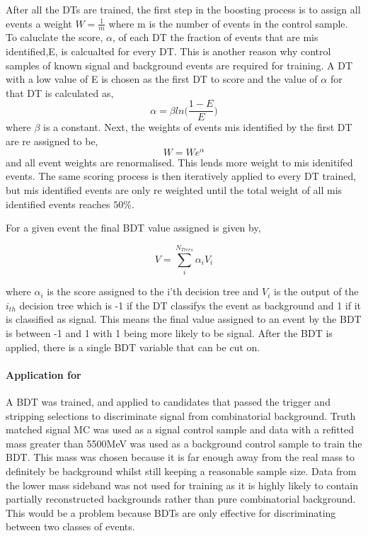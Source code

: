 After all the DTs are trained, the first step in the boosting process is to assign all events a weight $W=\frac{1}{m}$ where m is the number of events in the control sample.  To caluclate the score, $\alpha$, of each DT the fraction of events that are mis identified,E, is calcualted for every DT. This is another reason why control samples of known signal and background events are required for training.  A DT with a low value of E is chosen as the first DT to score and the value of $\alpha$ for that DT is calculated as,
\begin{equation}
  \alpha=\beta ln\big(\frac{1-E}{E}\big)
\end{equation}
where $\beta$ is a constant.  Next, the weights of events mis identified by the first DT are re assigned to be,
\begin{equation}
  W=W e^{\alpha}
\end{equation}
and all event weights are renormalised.  This lends more weight to mis idenitifed events. The same scoring process is then iteratively applied to every DT trained, but mis identified events are only re weighted until the total weight of all mis identified events reaches $50\%$. 

For a given event the final BDT value assigned is given by,

\begin{equation}
  V=\sum \limits_{i}^{N_{Trees}}\alpha_iV_i
\end{equation}

where $\alpha_i$ is the score assigned to the i'th decision tree and $V_i$ is the output of the $i_{th}$ decision tree which is -1 if the DT classifys the event as background and 1 if it is classified as signal.  This means the final value assigned to an event by the BDT is between -1 and 1 with 1 being more likely to be signal.  After the BDT is applied, there is a single BDT variable that can be cut on.

\paragraph{Application for \Bd \to \Kstar \etaz}
A BDT was trained, and applied to candidates that passed the trigger and stripping selections to discriminate signal from combinatorial background.  Truth matched signal MC was used as a signal control sample and data with a refitted \Bd mass greater than 5500MeV was used as a background control sample to train the BDT.  This mass was chosen because it is far enough away from the real \Bd mass to definitely be background whilst still keeping a reasonable sample size.  Data from the lower mass sideband was not used for training as it is highly likely to contain partially reconstructed backgrounds rather than pure combinatorial background.  This would be a problem because BDTs are only effective for discriminating between two classes of events.

